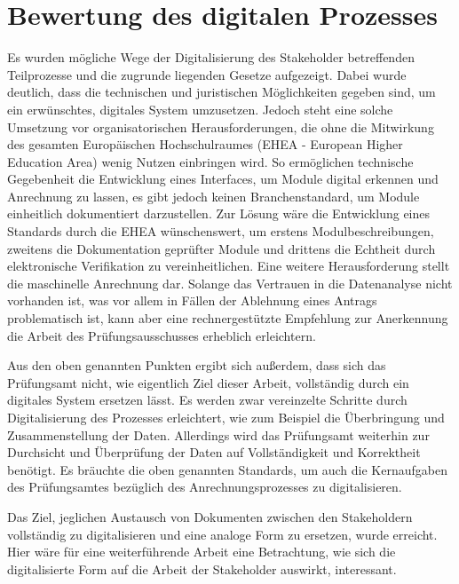 \section{Bewertung des digitalen Prozesses}

Es wurden mögliche Wege der Digitalisierung des Stakeholder betreffenden Teilprozesse und die zugrunde liegenden Gesetze aufgezeigt. Dabei wurde deutlich, dass die technischen und juristischen Möglichkeiten gegeben sind, um ein erwünschtes, digitales System umzusetzen. Jedoch steht eine solche Umsetzung vor organisatorischen Herausforderungen, die ohne die Mitwirkung des gesamten Europäischen Hochschulraumes (EHEA - European Higher Education Area) wenig Nutzen einbringen wird. So ermöglichen technische Gegebenheit die Entwicklung eines Interfaces, um Module digital erkennen und Anrechnung zu lassen, es gibt jedoch keinen Branchenstandard, um Module einheitlich dokumentiert darzustellen.
Zur Lösung wäre die Entwicklung eines Standards durch die EHEA wünschenswert, um erstens Modulbeschreibungen, zweitens die Dokumentation geprüfter Module und drittens die Echtheit durch elektronische Verifikation zu vereinheitlichen.
Eine weitere Herausforderung stellt die maschinelle Anrechnung dar. Solange das Vertrauen in die Datenanalyse nicht vorhanden ist, was vor allem in Fällen der Ablehnung eines Antrags problematisch ist, kann aber eine rechnergestützte Empfehlung zur Anerkennung die Arbeit des Prüfungsausschusses erheblich erleichtern.

Aus den oben genannten Punkten ergibt sich außerdem, dass sich das Prüfungsamt nicht, wie eigentlich Ziel dieser Arbeit, vollständig durch ein digitales System ersetzen lässt. Es werden zwar vereinzelte Schritte durch Digitalisierung des Prozesses erleichtert, wie zum Beispiel die Überbringung und Zusammenstellung der Daten. Allerdings wird das Prüfungsamt weiterhin zur Durchsicht und Überprüfung der Daten auf Vollständigkeit und Korrektheit benötigt. Es bräuchte die oben genannten Standards, um auch die Kernaufgaben des Prüfungsamtes bezüglich des Anrechnungsprozesses zu digitalisieren.

Das Ziel, jeglichen Austausch von Dokumenten zwischen den Stakeholdern vollständig zu digitalisieren und eine analoge Form zu ersetzen, wurde erreicht. Hier wäre für eine weiterführende Arbeit eine Betrachtung, wie sich die digitalisierte Form auf die Arbeit der Stakeholder auswirkt, interessant. 